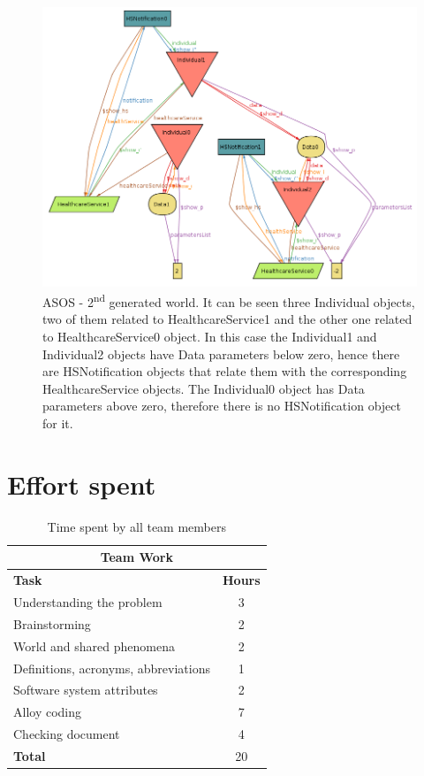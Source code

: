 \documentclass[a4paper, hidelinks, 12pt]{report}
\begin{document}
	\begin{figure}[H]
		\centering
		\includegraphics[scale=0.5]{Diagrams/goal_5_world_2.png}
		\caption[ASOS - Second generated world]{ASOS - 2\textsuperscript{nd} generated world. It can be seen three Individual objects, two of them related to HealthcareService1 and the other one related to HealthcareService0 object. In this case the Individual1 and Individual2 objects have Data parameters below zero, hence there are HSNotification objects that relate them with the corresponding HealthcareService objects. The Individual0 object has Data parameters above zero, therefore there is no HSNotification object for it.}
		\label{fig:goal_5_world_2}
	\end{figure}
	
	\chapter{Effort spent}
	\begin{table}[h]
		\centering
		\begin{tabular}{l c}
			\hline\hline
			\multicolumn{2}{c}{\textbf{Team Work}} \\
			\hline
			\textbf{Task} & \textbf{Hours} \\ [0.5ex]
			\hline
			Understanding the problem & 3  \\
			Brainstorming & 2 \\
			World and shared phenomena & 2 \\
			Definitions, acronyms, abbreviations & 1  \\
			Software system attributes & 2 \\
			Alloy coding & 7 \\
			Checking document  & 4  \\
			\hline
			\textbf{Total} & 20  \\
			\hline
		\end{tabular}
		\caption{Time spent by all team members}
		\label{fig:Time spent by all team members}
	\end{table}
	
\end{document}
